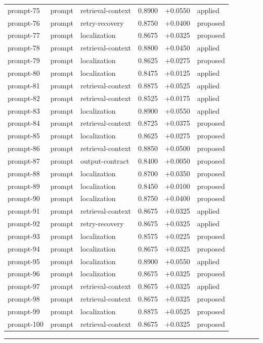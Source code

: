 \begin{center}
\begin{longtable}{llp{5.2cm}rrl}
prompt-75 & prompt & retrieval-context & 0.8900 & +0.0550 & applied \\
prompt-76 & prompt & retry-recovery & 0.8750 & +0.0400 & proposed \\
prompt-77 & prompt & localization & 0.8675 & +0.0325 & proposed \\
prompt-78 & prompt & retrieval-context & 0.8800 & +0.0450 & applied \\
prompt-79 & prompt & localization & 0.8625 & +0.0275 & proposed \\
prompt-80 & prompt & localization & 0.8475 & +0.0125 & applied \\
prompt-81 & prompt & retrieval-context & 0.8875 & +0.0525 & applied \\
prompt-82 & prompt & retrieval-context & 0.8525 & +0.0175 & applied \\
prompt-83 & prompt & localization & 0.8900 & +0.0550 & applied \\
prompt-84 & prompt & retrieval-context & 0.8725 & +0.0375 & proposed \\
prompt-85 & prompt & localization & 0.8625 & +0.0275 & proposed \\
prompt-86 & prompt & retrieval-context & 0.8850 & +0.0500 & proposed \\
prompt-87 & prompt & output-contract & 0.8400 & +0.0050 & proposed \\
prompt-88 & prompt & localization & 0.8700 & +0.0350 & proposed \\
prompt-89 & prompt & localization & 0.8450 & +0.0100 & proposed \\
prompt-90 & prompt & localization & 0.8750 & +0.0400 & proposed \\
prompt-91 & prompt & retrieval-context & 0.8675 & +0.0325 & applied \\
prompt-92 & prompt & retry-recovery & 0.8675 & +0.0325 & applied \\
prompt-93 & prompt & localization & 0.8575 & +0.0225 & proposed \\
prompt-94 & prompt & localization & 0.8675 & +0.0325 & proposed \\
prompt-95 & prompt & localization & 0.8900 & +0.0550 & applied \\
prompt-96 & prompt & localization & 0.8675 & +0.0325 & proposed \\
prompt-97 & prompt & retrieval-context & 0.8675 & +0.0325 & applied \\
prompt-98 & prompt & retrieval-context & 0.8675 & +0.0325 & proposed \\
prompt-99 & prompt & localization & 0.8875 & +0.0525 & proposed \\
prompt-100 & prompt & retrieval-context & 0.8675 & +0.0325 & proposed \\
\bottomrule\end{longtable}\end{center}
\par\bigskip\hrule\bigskip
